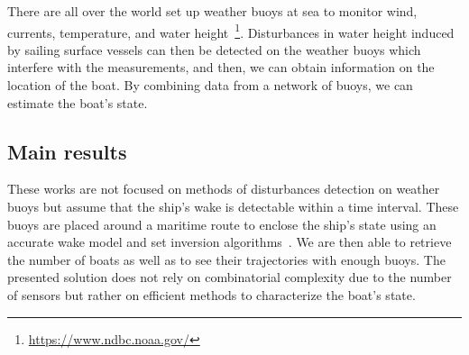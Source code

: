 \documentclass[14pt, a4paper]{article}
\begin{document}
		There are all over the world set up weather buoys at sea to monitor wind, currents, temperature, and water height~\footnote{\url{https://www.ndbc.noaa.gov/}}. Disturbances in water height induced by sailing surface vessels can then be detected on the weather buoys which interfere with the measurements, and then, we can obtain information on the location of the boat. By combining data from a network of buoys, we can estimate the boat's state.

	\subsection*{Main results}
		These works are not focused on methods of disturbances detection on weather buoys but assume that the ship's wake is detectable within a time interval. These buoys are placed around a maritime route to enclose the ship's state using an accurate wake model and set inversion algorithms~\cite{JaulinWalter93SetInvAutom}. We are then able to retrieve the number of boats as well as to see their trajectories with enough buoys. The presented solution does not rely on combinatorial complexity due to the number of sensors but rather on efficient methods to characterize the boat's state.
		
	\printbibliography[title={References},heading=subbibliography]

	\medskip
\end{document}
